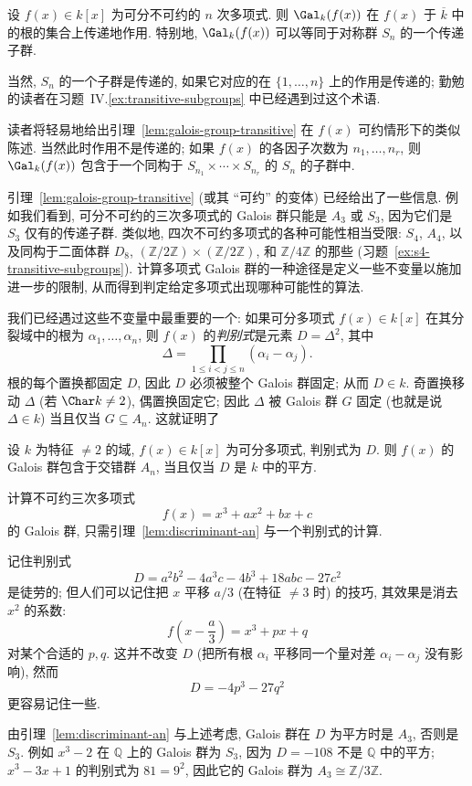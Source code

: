\begin{lemma}\label{lem:galois-group-transitive}
设 $f(x)\in k[x]$ 为可分不可约的 $n$ 次多项式. 则 $\Gal_k(f(x))$ 在 $f(x)$ 于 $\overline{k}$ 中的根的集合上传递地作用. 特别地, $\Gal_k(f(x))$ 可以等同于对称群 $S_n$ 的一个传递子群.
\end{lemma}

当然, $S_n$ 的一个子群是传递的, 如果它对应的在 $\{1,\ldots,n\}$ 上的作用是传递的; 勤勉的读者在习题~IV.\ref{ex:transitive-subgroups} 中已经遇到过这个术语.

读者将轻易地给出引理~\ref{lem:galois-group-transitive} 在 $f(x)$ 可约情形下的类似陈述. 当然此时作用不是传递的; 如果 $f(x)$ 的各因子次数为 $n_1,\ldots,n_r$, 则 $\Gal_k(f(x))$ 包含于一个同构于 $S_{n_1}\times\cdots\times S_{n_r}$ 的 $S_n$ 的子群中.

引理~\ref{lem:galois-group-transitive} (或其 ``可约'' 的变体) 已经给出了一些信息. 例如我们看到, 可分不可约的三次多项式的 Galois 群只能是 $A_3$ 或 $S_3$, 因为它们是 $S_3$ 仅有的传递子群. 类似地, 四次不可约多项式的各种可能性相当受限: $S_4$, $A_4$, 以及同构于二面体群 $D_8$, $(\mathbb{Z}/2\mathbb{Z})\times(\mathbb{Z}/2\mathbb{Z})$, 和 $\mathbb{Z}/4\mathbb{Z}$ 的那些 (习题~\ref{ex:s4-transitive-subgroups}). 计算多项式 Galois 群的一种途径是定义一些不变量以施加进一步的限制, 从而得到判定给定多项式出现哪种可能性的算法.

我们已经遇过这些不变量中最重要的一个: 如果可分多项式 $f(x)\in k[x]$ 在其分裂域中的根为 $\alpha_1,\ldots,\alpha_n$, 则 $f(x)$ 的\emph{判别式}是元素 $D=\Delta^2$, 其中
\[
\Delta=\prod_{1\le i<j\le n}(\alpha_i-\alpha_j).
\]
根的每个置换都固定 $D$, 因此 $D$ 必须被整个 Galois 群固定; 从而 $D\in k$. 奇置换移动 $\Delta$ (若 $\Char k\neq 2$), 偶置换固定它; 因此 $\Delta$ 被 Galois 群 $G$ 固定 (也就是说 $\Delta\in k$) 当且仅当 $G\subseteq A_n$. 这就证明了

\begin{lemma}\label{lem:discriminant-an}
设 $k$ 为特征 $\neq 2$ 的域, $f(x)\in k[x]$ 为可分多项式, 判别式为 $D$. 则 $f(x)$ 的 Galois 群包含于交错群 $A_n$, 当且仅当 $D$ 是 $k$ 中的平方.
\end{lemma}

\begin{example}\label{ex:cubic-discriminant}
计算不可约三次多项式
\[
f(x)=x^3+ax^2+bx+c
\]
的 Galois 群, 只需引理~\ref{lem:discriminant-an} 与一个判别式的计算.

记住判别式
\[
D=a^2b^2-4a^3c-4b^3+18abc-27c^2
\]
是徒劳的; 但人们可以记住把 $x$ 平移 $a/3$ (在特征 $\neq 3$ 时) 的技巧, 其效果是消去 $x^2$ 的系数:
\[
f\!\left(x-\frac{a}{3}\right)=x^3+px+q
\]
对某个合适的 $p,q$. 这并不改变 $D$ (把所有根 $\alpha_i$ 平移同一个量对差 $\alpha_i-\alpha_j$ 没有影响), 然而
\[
D=-4p^3-27q^2
\]
更容易记住一些.

由引理~\ref{lem:discriminant-an} 与上述考虑, Galois 群在 $D$ 为平方时是 $A_3$, 否则是 $S_3$. 例如 $x^3-2$ 在 $\mathbb{Q}$ 上的 Galois 群为 $S_3$, 因为 $D=-108$ 不是 $\mathbb{Q}$ 中的平方; $x^3-3x+1$ 的判别式为 $81=9^2$, 因此它的 Galois 群为 $A_3\cong\mathbb{Z}/3\mathbb{Z}$.
\end{example}

